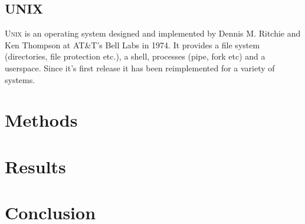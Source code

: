 \documentclass{report}
\begin{document}
\section{\textsc{UNIX}}

\textsc{Unix} \cite{ritchie1978unix} is an operating system designed and
implemented by Dennis M. Ritchie and Ken Thompson at AT\&T's Bell Labs in 1974.
It provides a file system (directories, file protection etc.), a shell,
processes (pipe, fork etc) and a userspace. Since it's first release it has been
reimplemented for a variety of systems.

\chapter{Methods}

\chapter{Results}

\chapter{Conclusion}



\end{document}
